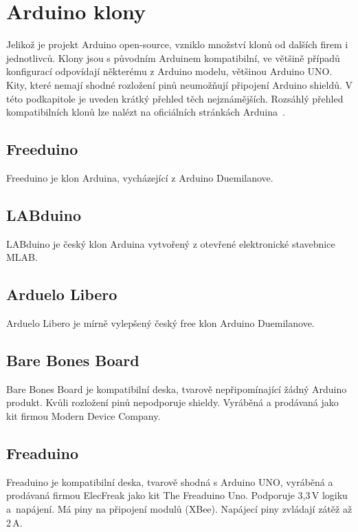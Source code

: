 \section{Arduino klony}
\label{KapArduinoKlony}

	Jelikož je projekt Arduino open-source, vzniklo množství klonů od dalších firem i jednotlivců. Klony jsou s původním Arduinem kompatibilní, ve většině případů konfigurací odpovídají některému z Arduino modelu, většinou Arduino UNO. Kity, které nemají shodné rozložení pinů neumožňují připojení Arduino shieldů. V této podkapitole je uveden krátký přehled těch nejznámějších. Rozsáhlý přehled kompatibilních klonů lze nalézt na oficiálních stránkách Arduina~\cite{ArduinoClonesWeb}.
	
	\subsection{Freeduino} 
	Freeduino je klon Arduina, vycházející z Arduino Duemilanove.
	
	\subsection{LABduino} 
	LABduino je český klon Arduina vytvořený z otevřené elektronické stavebnice MLAB.
	
	\subsection{Arduelo Libero}	
	Arduelo Libero je mírně vylepšený český free klon Arduino Duemilanove.
	
	\subsection{Bare Bones Board} 
	Bare Bones Board je kompatibilní deska, tvarově nepřipomínající žádný Arduino produkt. Kvůli rozložení pinů nepodporuje shieldy. Vyráběná a prodávaná jako kit firmou Modern Device Company.
	
	\subsection{Freaduino} 
	Freaduino je kompatibilní deska, tvarově shodná s Arduino UNO, vyráběná a prodávaná firmou ElecFreak jako kit The Freaduino Uno. Podporuje 3,3\,V logiku a~napájení. Má piny na připojení modulů (XBee). Napájecí piny zvládají zátěž až 2\,A.

